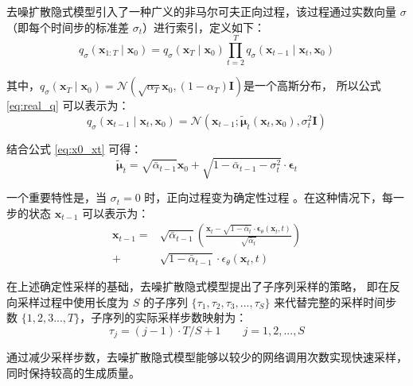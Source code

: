 去噪扩散隐式模型引入了一种广义的非马尔可夫正向过程，该过程通过实数向量 $\sigma$ （即每个时间步的标准差 $\sigma_t$）进行索引，定义如下：
\begin{equation}
    q_\sigma\left(\mathbf{x}_{1: T} \mid \mathbf{x}_0\right)=q_\sigma\left(\mathbf{x}_T \mid \mathbf{x}_0\right) \prod_{t=2}^T q_\sigma\left(\mathbf{x}_{t-1} \mid \mathbf{x}_t, \mathbf{x}_0\right)
\end{equation}

其中，$q_\sigma\left(\boldsymbol{x}_T \mid \boldsymbol{x}_0\right)=\mathcal{N}\left(\sqrt{\alpha_T} \boldsymbol{x}_0,\left(1-\alpha_T\right) \boldsymbol{I}\right)$是一个高斯分布， 所以公式 \eqref{eq:real_q} 可以表示为：
\begin{equation}
    q_\sigma\left(\mathbf{x}_{t-1} \mid \mathbf{x}_t, \mathbf{x}_0\right)=\mathcal{N}\left(\mathbf{x}_{t-1} ; \tilde{\boldsymbol{\mu}}_t\left(\mathbf{x}_t, \mathbf{x}_0\right), \sigma_t^2 \mathbf{I}\right)
\end{equation}

结合公式 \eqref{eq:x0_xt} 可得：
\begin{equation}
    \tilde{\boldsymbol{\mu}}_t=\sqrt{\bar{\alpha}_{t-1}} \mathbf{x}_0+\sqrt{1-\bar{\alpha}_{t-1}-\sigma_t^2} \cdot \boldsymbol{\epsilon}_t
\end{equation}

一个重要特性是，当 $\sigma_t=0$ 时，正向过程变为确定性过程 \cite{ddim}。在这种情况下，每一步的状态 $\mathbf{x}_{t-1}$ 可以表示为：
\begin{equation}
\begin{split}
     \mathbf{x}_{t-1} =& \sqrt{\bar{\alpha}_{t-1}}\left(\frac{\mathbf{x}_t-\sqrt{1-\bar{\alpha}_t} \cdot \boldsymbol{\epsilon}_\theta\left(\mathbf{x}_t, t\right)}{\sqrt{\bar{\alpha}_t}}\right) \\
     + &\sqrt{1-\bar{\alpha}_{t-1}} \cdot \epsilon_\theta\left(\mathbf{x}_t, t\right)
\end{split}
\end{equation}

在上述确定性采样的基础，去噪扩散隐式模型提出了子序列采样的策略，
即在反向采样过程中使用长度为 $S$ 的子序列 $\{\tau_1, \tau_2, \tau_3, ..., \tau_S\}$ 来代替完整的采样时间步数 $\{1,2,3..., T\}$，子序列的实际采样步数映射为：
\begin{equation}
    \tau_j=(j-1) \cdot T / S+1  \quad\quad j=1,2,...,S 
\end{equation}

通过减少采样步数，去噪扩散隐式模型能够以较少的网络调用次数实现快速采样，同时保持较高的生成质量。

